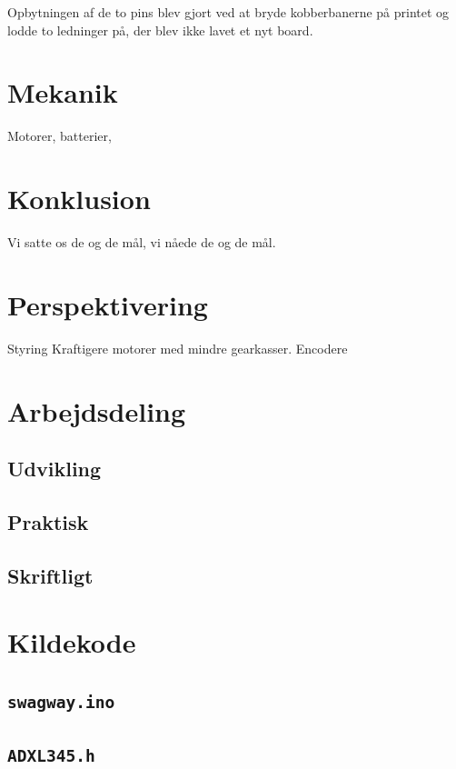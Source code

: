 \documentclass[a4paper,oneside,article,danish,table]{memoir}
\begin{document}
Opbytningen af de to pins blev gjort ved at bryde kobberbanerne på printet og lodde to ledninger på, der blev ikke lavet et nyt board.

\chapter{Mekanik}
Motorer, batterier, 
\chapter{Konklusion} \label{chap:kon}
Vi satte os de og de mål, vi nåede de og de mål.

\chapter{Perspektivering} \label{chap:per}
Styring
Kraftigere motorer med mindre gearkasser.
Encodere


\clearpage
\listoftables
\listoffigures
\nocite{*}
 
\clearpage \appendix

\chapter{Arbejdsdeling}

\section{Udvikling}
\section{Praktisk}
\section{Skriftligt}

\chapter{Kildekode}

\section{\texttt{swagway.ino}}

\section{\texttt{ADXL345.h}}

\end{document}
